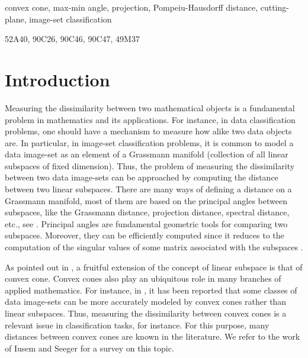 \documentclass[hidelinks,onefignum,onetabnum]{siamart250211}
\theoremstyle{definition}
\theoremstyle{remark}
\begin{document}
\begin{keywords}
    convex cone, max-min angle, projection, Pompeiu-Hausdorff distance, cutting-plane, image-set classification
\end{keywords}

\begin{MSCcodes}
    52A40, 90C26, 90C46, 90C47, 49M37
\end{MSCcodes}



\section{Introduction}
Measuring the dissimilarity between two mathematical objects is a fundamental problem in mathematics and its applications. For instance, in data classification problems, one should have a mechanism to measure how alike two data objects are. In particular, in image-set classification problems, it is common to model a data image-set as an element of a Grassmann manifold (collection of all linear subspaces of fixed dimension). Thus, the problem of measuring the dissimilarity between two data image-sets can be approached by computing the distance between two linear subspaces. There are many ways of defining a distance on a Grassmann manifold, most of them are based on the principal angles between subspaces, like the Grassmann distance, projection distance, spectral distance, etc., see \cite{YeLim}. Principal angles are fundamental geometric tools for comparing two subspaces. Moreover, they can be efficiently computed since it reduces to the computation of the singular values of some matrix associated with the subspaces \cite{Miao}.

As pointed out in \cite{IS2010}, a fruitful extension of the concept of linear subspace is that of convex cone. Convex cones also play an ubiquitous role in many branches of applied mathematics. For instance, in \cite{Sogi}, it has been reported that some classes of data image-sets can be more accurately modeled by convex cones rather than linear subspaces. Thus, measuring the dissimilarity between convex cones is a relevant issue in classification tasks, for instance. For this purpose, many distances between convex cones are known in the literature. We refer to the work of Iusem and Seeger \cite{IS2010} for a survey on this topic.
\end{document}
